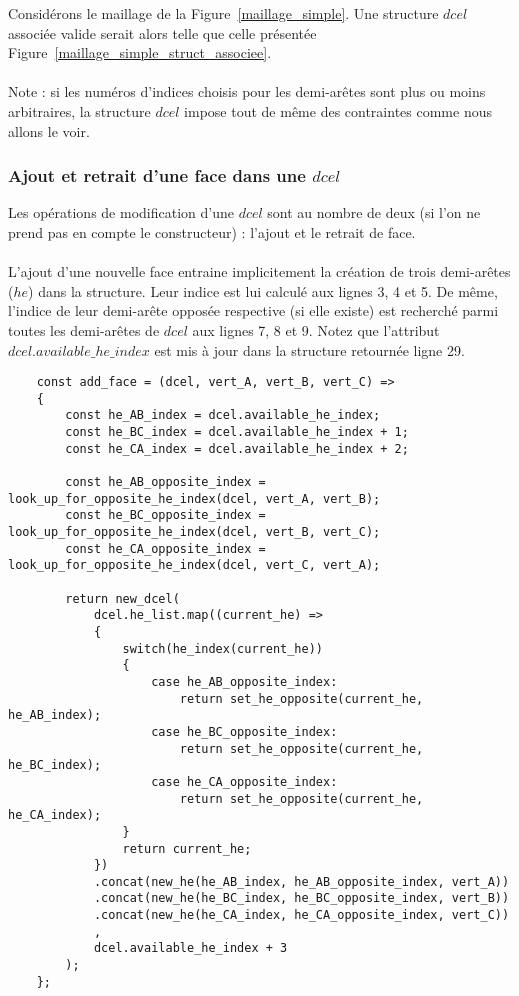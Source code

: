 \documentclass[]{article}
\begin{document}
	Considérons le maillage de la Figure~\ref{maillage_simple}. Une structure $dcel$ associée valide serait alors telle que celle présentée Figure~\ref{maillage_simple_struct_associee}.\\\\
	Note : si les numéros d'indices choisis pour les demi-arêtes sont plus ou moins arbitraires, la structure $dcel$ impose tout de même des contraintes comme nous allons le voir.
	
	
	\subsubsection{Ajout et retrait d'une face dans une $dcel$}
	Les opérations de modification d'une $dcel$ sont au nombre de deux (si l'on ne prend pas en compte le constructeur) : l'ajout et le retrait de face.\\\\
	L'ajout d'une nouvelle face entraine implicitement la création de trois demi-arêtes ($he$) dans la structure. Leur indice est lui calculé aux lignes 3, 4 et 5. De même, l'indice de leur demi-arête opposée respective (si elle existe) est recherché parmi toutes les demi-arêtes de $dcel$ aux lignes 7, 8 et 9.
	Notez que l'attribut $dcel.available\_he\_index$ est mis à jour dans la structure retournée ligne 29.
	\begin{lstlisting}
	const add_face = (dcel, vert_A, vert_B, vert_C) =>
	{
		const he_AB_index = dcel.available_he_index;
		const he_BC_index = dcel.available_he_index + 1;
		const he_CA_index = dcel.available_he_index + 2;
		
		const he_AB_opposite_index = look_up_for_opposite_he_index(dcel, vert_A, vert_B);
		const he_BC_opposite_index = look_up_for_opposite_he_index(dcel, vert_B, vert_C);
		const he_CA_opposite_index = look_up_for_opposite_he_index(dcel, vert_C, vert_A);
		
		return new_dcel(
			dcel.he_list.map((current_he) =>
			{
				switch(he_index(current_he))
				{
					case he_AB_opposite_index:
						return set_he_opposite(current_he, he_AB_index);
					case he_BC_opposite_index:
						return set_he_opposite(current_he, he_BC_index);
					case he_CA_opposite_index:
						return set_he_opposite(current_he, he_CA_index);
				}
				return current_he;
			})
			.concat(new_he(he_AB_index, he_AB_opposite_index, vert_A))
			.concat(new_he(he_BC_index, he_BC_opposite_index, vert_B))
			.concat(new_he(he_CA_index, he_CA_opposite_index, vert_C))
			,
			dcel.available_he_index + 3
		);
	};
	\end{lstlisting}
	
\end{document}
